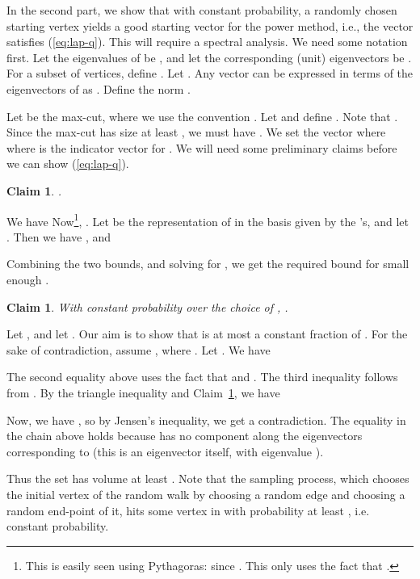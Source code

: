 \documentclass[11pt]{article}
\newtheorem{claim}[theorem]{Claim}
\newenvironment{myproof}{\noindent {\sc Proof:}}{}
\begin{document}
In the second part, we show that with constant probability, a randomly chosen starting vertex yields a good starting vector for the power method, i.e., the vector  satisfies (\ref{eq:lap-q}). This will require a spectral analysis.  We need some notation first.
Let the eigenvalues of  be , and let the corresponding (unit) eigenvectors be .
For a subset  of vertices, define . Let . Any vector  can be
expressed in terms of the eigenvectors of  as .
Define the norm .

Let  be the max-cut, where we use the convention . Let  and define
. Note that . Since the max-cut has size at least , we must have .
We set the vector  where 
where  is the indicator vector for . We will need some
preliminary claims before we can show (\ref{eq:lap-q}).

\begin{claim} \label{clm:hnorm-x} .
\end{claim}

\begin{myproof} We have
 Now\footnote{This is easily seen using Pythagoras: since . This
only uses the fact that .},
.
Let  be the
representation of  in the basis given by the 's, and let . Then we have , and


Combining the two bounds, and solving for , we get the required bound for small enough .
\end{myproof}


\begin{claim} \label{clm:hnorm-e}
With constant probability over the choice of , .
\end{claim}
\begin{myproof} Let , and let . Our aim is to show that
 is at most a constant fraction of . For the sake of
contradiction, assume ,
where . Let .
We have

The second equality above uses the fact that  and .
The third inequality follows from .
By the triangle inequality and Claim~\ref{clm:hnorm-x}, we have

Now, we have ,
so by Jensen's inequality, we get
 a contradiction.
The equality in the chain above holds because  has no component along
the eigenvectors corresponding to  (this is an eigenvector itself,
with eigenvalue ).

Thus the set  has volume at least . Note that the sampling process, which chooses
the initial vertex of the random walk by choosing a random edge and choosing a
random end-point  of it, hits some vertex in  with probability
at least , i.e. constant probability.
\end{myproof}
\medskip
\end{document}

